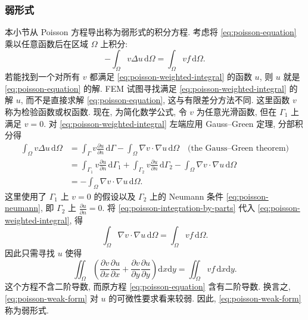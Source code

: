\subsubsection{{弱形式}}\label{subsec:weak-form}
{本小节从 Poisson 方程导出称为弱形式的积分方程. 考虑将 \eqref{eq:poisson-equation} 乘以任意函数后在区域 $\Omega$ 上积分:}
\begin{equation}\label{eq:poisson-weighted-integral}
-\int_\Omega v\Delta u\,\mathrm d\Omega=\int_\Omega vf\,\mathrm d\Omega.
\end{equation}
{若能找到一个对所有 $v$ 都满足 \eqref{eq:poisson-weighted-integral} 的函数 $u$, 则 $u$ 就是 \eqref{eq:poisson-equation} 的解. FEM 试图寻找满足 \eqref{eq:poisson-weighted-integral} 的解 $u$, 而不是直接求解 \eqref{eq:poisson-equation}, 这与有限差分方法不同. 这里函数 $v$ 称为检验函数或权函数.}
{现在, 为简化数学公式, 令 $v$ 为任意光滑函数, 但在 $\Gamma_1$ 上满足 $v=0$. 对 \eqref{eq:poisson-weighted-integral} 左端应用 Gauss--Green 定理, 分部积分得}
\begin{equation}\label{eq:poisson-integration-by-parts}
\begin{aligned}
\int_\Omega v\Delta u\,\mathrm d\Omega
&=\int_\Gamma v\frac{\partial u}{\partial n}\,\mathrm d\Gamma-\int_\Omega\nabla v\cdot\nabla u\,\mathrm d\Omega\quad\text{(the Gauss--Green theorem)}\\
&=\int_{\Gamma_1}v\frac{\partial u}{\partial n}\,\mathrm d\Gamma_1+\int_{\Gamma_2}v\frac{\partial u}{\partial n}\,\mathrm d\Gamma_2-\int_\Omega\nabla v\cdot\nabla u\,\mathrm d\Omega\\
&=-\int_\Omega\nabla v\cdot\nabla u\,\mathrm d\Omega.
\end{aligned}
\end{equation}
{这里使用了 $\Gamma_1$ 上 $v=0$ 的假设以及 $\Gamma_2$ 上的 Neumann 条件 \eqref{eq:poisson-neumann}, 即 $\Gamma_2$ 上 $\frac{\partial u}{\partial n}=0$. 将 \eqref{eq:poisson-integration-by-parts} 代入 \eqref{eq:poisson-weighted-integral}, 得}
\[\int_\Omega\nabla v\cdot\nabla u\,\mathrm d\Omega=\int_\Omega vf\,\mathrm d\Omega.\]
{因此只需寻找 $u$ 使得}
\begin{equation}\label{eq:poisson-weak-form}
\iint_\Omega\left(\frac{\partial v}{\partial x}\frac{\partial u}{\partial x}+\frac{\partial v}{\partial y}\frac{\partial u}{\partial y}\right)\mathrm dx\mathrm dy=\iint_\Omega vf\,\mathrm dx\mathrm dy.
\end{equation}
{这个方程不含二阶导数, 而原方程 \eqref{eq:poisson-equation} 含有二阶导数. 换言之, \eqref{eq:poisson-weak-form} 对 $u$ 的可微性要求看来较弱. 因此, \eqref{eq:poisson-weak-form} 称为弱形式.}
